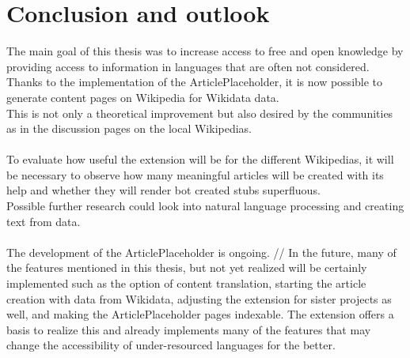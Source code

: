 \chapter{Conclusion and outlook}

The main goal of this thesis was to increase access to free and open knowledge by providing access to information in languages that are often not considered. Thanks to the implementation of the ArticlePlaceholder, it is now possible to generate content pages on Wikipedia for Wikidata data. \\
This is not only a theoretical improvement but also desired by the communities as in the discussion pages on the local Wikipedias. \\
\\
To evaluate how useful the extension will be for the different Wikipedias, it will be necessary to observe how many meaningful articles will be created with its help and whether they will render bot created stubs superfluous. \\
Possible further research could look into natural language processing and creating text from data. \\
\\
The development of the ArticlePlaceholder is ongoing. //
In the future, many of the features mentioned in this thesis, but not yet realized will be certainly implemented such as the option of content translation, starting the article creation with data from Wikidata, adjusting the extension for sister projects as well, and making the ArticlePlaceholder pages indexable. The extension offers a basis to realize this and already implements many of the features that may change the accessibility of under-resourced languages for the better. 
